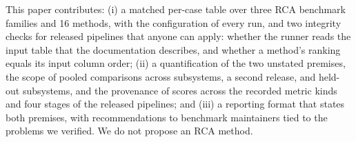 This paper contributes:
(i) a matched per-case table over three RCA benchmark families and 16 methods, with the configuration of every run, and two integrity checks for released pipelines that anyone can apply: whether the runner reads the input table that the documentation describes, and whether a method's ranking equals its input column order;
(ii) a quantification of the two unstated premises, the scope of pooled comparisons across subsystems, a second release, and held-out subsystems, and the provenance of scores across the recorded metric kinds and four stages of the released pipelines; and
(iii) a reporting format that states both premises, with recommendations to benchmark maintainers tied to the problems we verified.
We do not propose an RCA method.
